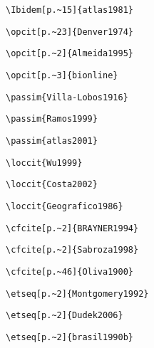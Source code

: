 \begin{alineas}
\begin{verbatim}
\Ibidem[p.~15]{atlas1981}
\end{verbatim}

\begin{verbatim}
\opcit[p.~23]{Denver1974}
\end{verbatim}

\begin{verbatim}
\opcit[p.~2]{Almeida1995}
\end{verbatim}

\begin{verbatim}
\opcit[p.~3]{bionline}
\end{verbatim}

\begin{verbatim}
\passim{Villa-Lobos1916}
\end{verbatim}

\begin{verbatim}
\passim{Ramos1999}
\end{verbatim}

\begin{verbatim}
\passim{atlas2001}
\end{verbatim}

\begin{verbatim}
\loccit{Wu1999}
\end{verbatim}

\begin{verbatim}
\loccit{Costa2002}
\end{verbatim}

\begin{verbatim}
\loccit{Geografico1986}
\end{verbatim}

\begin{verbatim}
\cfcite[p.~2]{BRAYNER1994}
\end{verbatim}

\begin{verbatim}
\cfcite[p.~2]{Sabroza1998}
\end{verbatim}

\begin{verbatim}
\cfcite[p.~46]{Oliva1900}
\end{verbatim}

\begin{verbatim}
\etseq[p.~2]{Montgomery1992}
\end{verbatim}

\begin{verbatim}
\etseq[p.~2]{Dudek2006}
\end{verbatim}

\begin{verbatim}
\etseq[p.~2]{brasil1990b}
\end{verbatim}

\end{alineas}


